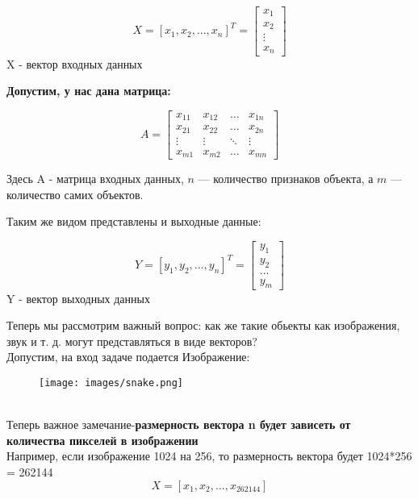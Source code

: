 \documentclass[a4paper,12pt]{article} %
\begin{document}
\[
    X = [x_1, x_2, \ldots, x_n]^T =  \begin{bmatrix}
x_1 \\
x_2 \\
\vdots \\
x_n
\end{bmatrix}
\]
X - вектор входных данных

\textbf{Допустим, у нас дана матрица:}

\[A =
\begin{bmatrix}
x_{11} & x_{12} & \ldots & x_{1n} \\
x_{21} & x_{22} & \ldots & x_{2n} \\
\vdots & \vdots & \ddots & \vdots \\
x_{m1} & x_{m2} & \ldots & x_{mn}
\end{bmatrix}
\]
\raggedright
Здесь A - матрица входных данных, \( n \) — количество признаков объекта, а \( m \) — количество самих объектов.

Таким же видом представлены и выходные данные:

\[
    Y = [y_1, y_2, ... , y_n ]^T = \begin{bmatrix}
                                       y_1 \\
                                       y_2 \\
                                       ...\\
                                       y_m
                                       \end{bmatrix}
\]
Y - вектор выходных данных

\newpage
Теперь мы рассмотрим важный вопрос: как же такие обьекты как изображения, звук и т. д. могут представляться в виде векторов? \\
\vspace{1cm}
    Допустим, на вход задаче подается Изображение:
    \begin{figure}[htbp]
        \centering
        \texttt{[image: images/snake.png]}
        \label{fig:example}
    \end{figure}
\\
    Теперь важное замечание-\textbf{размерность вектора n будет зависеть от количества пикселей в изображении} \\
    \vspace{1cm}
    Например, если изображение 1024 на 256, то размерность вектора будет 1024*256 = 262144
    \vspace{0.9cm}
    \[X = [x_1, x_2, ... , x_{262144} ]
    \]
\end{document}
